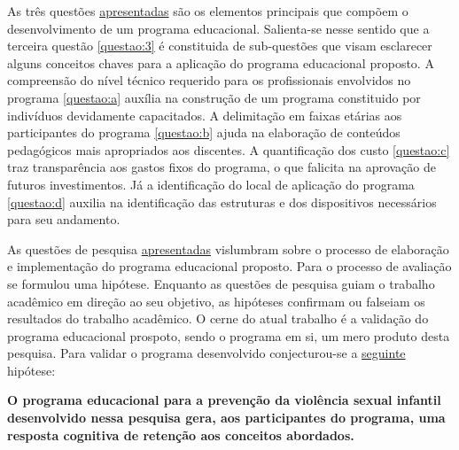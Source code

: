 \vspace{-0.2cm}

As três questões \hyperref[questoes]{apresentadas} são os elementos principais que compõem o desenvolvimento de um programa educacional. Salienta-se nesse sentido que a terceira questão \ref{questao:3} é constituida de sub-questões que visam esclarecer alguns conceitos chaves para a aplicação do programa educacional proposto. A compreensão do nível técnico requerido para os profissionais envolvidos no programa \ref{questao:a} auxília na construção de um programa constituido por indivíduos devidamente capacitados. A delimitação em faixas etárias aos participantes do programa \ref{questao:b} ajuda na elaboração de conteúdos pedagógicos mais apropriados aos discentes. A quantificação dos custo \ref{questao:c} traz transparência aos gastos fixos do programa, o que falicita na aprovação de futuros investimentos. Já a identificação do local de aplicação do programa \ref{questao:d} auxilia na identificação das estruturas e dos dispositivos necessários para seu andamento.





As questões de pesquisa \hyperref[questoes]{apresentadas} vislumbram sobre o processo de elaboração e implementação do programa educacional proposto. Para o processo de avaliação se formulou uma hipótese. Enquanto as questões de pesquisa guiam o trabalho acadêmico em direção ao seu objetivo, as hipóteses confirmam ou falseiam os resultados do trabalho acadêmico. O cerne do atual trabalho é a validação do programa educacional prospoto, sendo o programa em si, um mero produto desta pesquisa. Para validar o programa desenvolvido conjecturou-se a \hyperref[hipotese]{seguinte} hipótese: 

\vspace{0.6cm}

\vspace{-0.6cm}
\begin{framed}
  \textbf{O programa educacional para a prevenção da violência sexual infantil desenvolvido nessa pesquisa gera, aos participantes do programa, uma resposta cognitiva de retenção aos conceitos abordados.} 
\end{framed}

